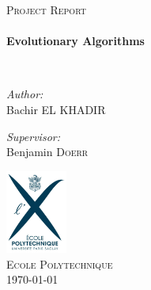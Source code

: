 \begin{titlepage}
\begin{center}

\vfill

\textsc{\Large Project Report}\\[0.5cm]

\HRule \\[0.4cm]
{ \huge \bfseries Evolutionary Algorithms   \\[0.4cm] }

\HRule \\[1.5cm]

\begin{minipage}{0.4\textwidth}
\begin{flushleft} \large
\emph{Author:}\\
Bachir \textsc{EL KHADIR}
\end{flushleft}
\end{minipage}
\begin{minipage}{0.4\textwidth}
\begin{flushright} \large
\emph{Supervisor:} \\
Benjamin \textsc{Doerr}
\end{flushright}
\end{minipage}

\vfill

\includegraphics[width=0.15\textwidth]{img/logo-X.png}~\\[1cm]

\textsc{\LARGE Ecole Polytechnique}\\[1.5cm]


{\large \today}

\end{center}
\end{titlepage}